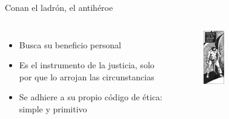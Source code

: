 \begin{frame}{Conan el ladrón, el antihéroe}
\begin{columns}
 \begin{itemize}
   \item Busca su beneficio personal
   \item Es el instrumento de la justicia, solo por que lo arrojan las circunstancias
   \item Se adhiere a su propio código de ética: simple y primitivo
 \end{itemize}
 \begin{figure}[htb]
    \centering
    \includegraphics[width=0.25\textwidth]{img/tropes/antiheroe}
 \end{figure}
 \end{columns}
\end{frame}

